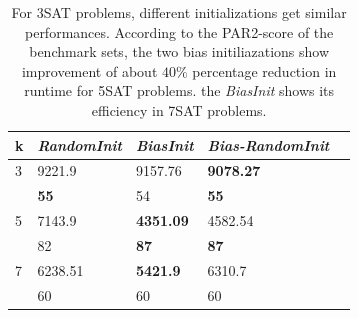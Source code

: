 \documentclass[12pt,a4paper,twoside]{scrartcl}
\numberwithin{equation}{section}
\begin{document}
\begin{table}[H]
\label{tab:com}
\begin{center}
    \begin{tabular}{|l|l|l|l|p{1cm}|}
\hline 
    k &\emph{RandomInit}&\emph{BiasInit}&\emph{Bias-RandomInit} \\ \hline
	3&9221.9 &9157.76 &\textbf{9078.27} \\ 
	&\textbf{55} &54 & \textbf{55} \\ \hline
	5&7143.9&\textbf{4351.09}&4582.54\\ 
	&82 &\textbf{87} &\textbf{87}\\ \hline
	7&6238.51&\textbf{5421.9}& 6310.7\\
	&60 & 60 & 60 \\ \hline
	
\end{tabular}
\caption{For 3SAT problems, different initializations get similar performances. According to the PAR2-score of the benchmark sets, the two bias initiliazations show improvement of about $40\%$ percentage reduction in runtime for 5SAT problems.  the \emph{BiasInit} shows its efficiency in 7SAT problems.}
\end{center}
\end{table} 
\end{document}

